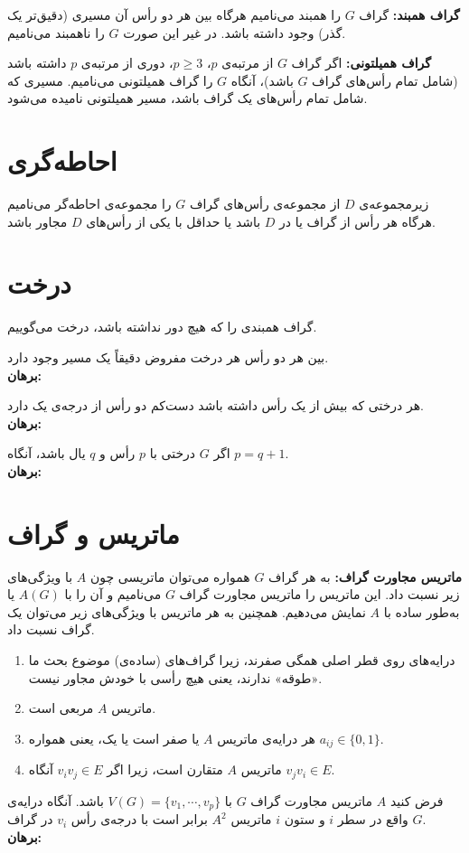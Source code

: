 \textbf{گراف همبند:}
گراف $G$ را همبند می‌نامیم هرگاه بین هر دو رأس آن مسیری (دقیق‌تر یک گذر) وجود داشته باشد. در غیر این صورت $G$ را ناهمبند می‌نامیم.

\textbf{گراف همیلتونی:}
اگر گراف $G$ از مرتبه‌ی $p$،
$p \geq 3$،
دوری از مرتبه‌ی $p$ داشته باشد (شامل تمام رأس‌های گراف $G$ باشد)، آنگاه $G$ را گراف همیلتونی می‌نامیم. مسیری که شامل تمام رأس‌های یک گراف باشد، مسیر همیلتونی نامیده می‌شود.

\section{احاطه‌گری}
زیرمجموعه‌ی $D$ از مجموعه‌ی رأس‌های گراف $G$ را مجموعه‌ی احاطه‌گر می‌نامیم هرگاه هر رأس از گراف یا در $D$ باشد یا حداقل با یکی از رأس‌های $D$ مجاور باشد.

\section{درخت}
گراف همبندی را که هیچ دور نداشته باشد، درخت می‌گوییم.
\begin{theorem}
	بین هر دو رأس هر درخت مفروض دقیقاً یک مسیر وجود دارد. \\
	\textbf{برهان:}
\end{theorem}

\begin{theorem}
	هر درختی که بیش از یک رأس داشته باشد دست‌کم دو رأس از درجه‌ی یک دارد. \\
	\textbf{برهان:}
\end{theorem}

\begin{theorem}
	اگر $G$ درختی با $p$ رأس و $q$ یال باشد، آنگاه
	$p=q+1$. \\
	\textbf{برهان:}
\end{theorem}

\section{ماتریس و گراف}
\textbf{ماتریس مجاورت گراف:}
به هر گراف $G$ همواره می‌توان ماتریسی چون $A$ با ویژگی‌های زیر نسبت داد. این ماتریس را ماتریس مجاورت گراف $G$ می‌نامیم و آن را با
$A(G)$
یا به‌طور ساده با $A$ نمایش می‌دهیم. همچنین به هر ماتریس با ویژگی‌های زیر می‌توان یک گراف نسبت داد.
\begin{enumerate}
	\item 
	درایه‌های روی قطر اصلی همگی صفرند، زیرا گراف‌های (ساده‌ی) موضوع بحث ما «طوقه» ندارند، یعنی هیچ رأسی با خودش مجاور نیست.
	\item 
	ماتریس $A$ مربعی است.
	\item 
	هر درایه‌ی ماتریس $A$ یا صفر است یا یک، یعنی همواره
	$a_{ij} \in \{0,1\}$.
	\item 
	ماتریس $A$ متقارن است، زیرا اگر
	$v_iv_j \in E$
	آنگاه
	$v_jv_i \in E$.
\end{enumerate}

\begin{theorem}
	فرض کنید $A$ ماتریس مجاورت گراف $G$ با
	$V(G)=\{v_1,\cdots,v_p\}$
	باشد. آنگاه درایه‌ی واقع در سطر $i$ و ستون $i$ ماتریس
	$A^2$
	برابر است با درجه‌ی رأس
	$v_i$
	در گراف $G$. \\ 
	\textbf{برهان:}
\end{theorem}

